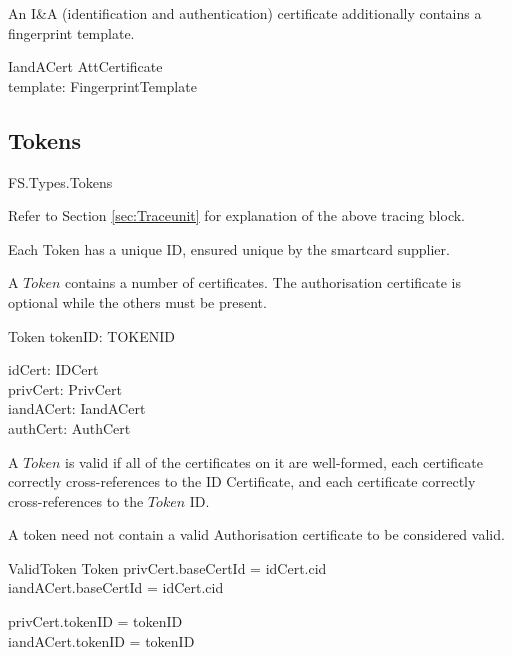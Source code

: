 An I\&A (identification and authentication) certificate additionally contains
a fingerprint template. 
\begin{schema}{IandACert}
	AttCertificate
\\	template: FingerprintTemplate
\end{schema}

\subsection{Tokens}
\label{page:firstTraceunit}
\begin{traceunit}{FS.Types.Tokens}
\end{traceunit}
\begin{Zcomment}
\item 
Refer to Section \ref{sec:Traceunit} for explanation of the
above tracing block.
\end{Zcomment}
Each Token has a unique ID, ensured unique by the smartcard supplier.
\begin{zed}
	[ TOKENID ]
\end{zed}

A $Token$ contains a number of certificates. The
authorisation certificate is optional while the others must be present.
\begin{schema}{Token}
	tokenID: TOKENID

\also	idCert: IDCert
\\	privCert: PrivCert
\\	iandACert: IandACert
\\	authCert: \Optional AuthCert
\end{schema}


A $Token$ is valid if all of the certificates on it are well-formed,
each certificate correctly cross-references to the ID Certificate,
and each certificate correctly cross-references to the $Token$ ID.

A token need not contain a valid Authorisation certificate to be considered valid.

\begin{schema}{ValidToken}
	Token
\where
	privCert.baseCertId = idCert.cid
\\	iandACert.baseCertId = idCert.cid

\also	privCert.tokenID = tokenID
\\	iandACert.tokenID = tokenID
\end{schema}

